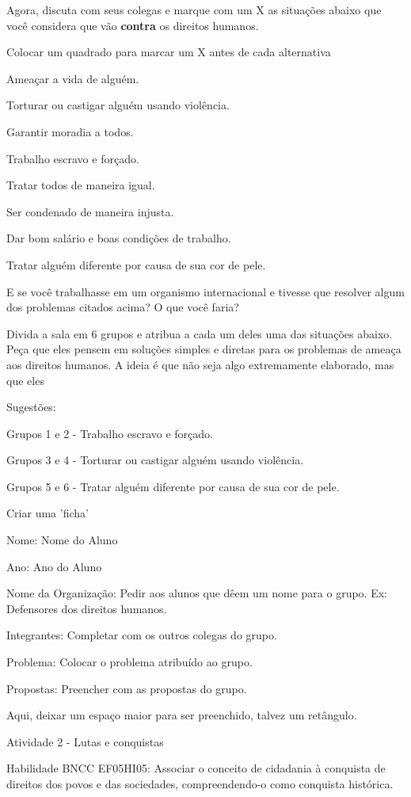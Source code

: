 Agora, discuta com seus colegas e marque com um X as situações abaixo
que você considera que vão \textbf{contra} os direitos humanos.

Colocar um quadrado para marcar um X antes de cada alternativa

Ameaçar a vida de alguém.

Torturar ou castigar alguém usando violência.

Garantir moradia a todos.

Trabalho escravo e forçado.

Tratar todos de maneira igual.

Ser condenado de maneira injusta.

Dar bom salário e boas condições de trabalho.

Tratar alguém diferente por causa de sua cor de pele.

E se você trabalhasse em um organismo internacional e tivesse que
resolver algum dos problemas citados acima? O que você faria?

Divida a sala em 6 grupos e atribua a cada um deles uma das situações
abaixo. Peça que eles pensem em soluções simples e diretas para os
problemas de ameaça aos direitos humanos. A ideia é que não seja algo
extremamente elaborado, mas que eles

Sugestões:

Grupos 1 e 2 - Trabalho escravo e forçado.

Grupos 3 e 4 - Torturar ou castigar alguém usando violência.

Grupos 5 e 6 - Tratar alguém diferente por causa de sua cor de pele.

Criar uma 'ficha'

Nome: Nome do Aluno

Ano: Ano do Aluno

Nome da Organização: Pedir aos alunos que dêem um nome para o grupo. Ex:
Defensores dos direitos humanos.

Integrantes: Completar com os outros colegas do grupo.

Problema: Colocar o problema atribuído ao grupo.

Propostas: Preencher com as propostas do grupo.

Aqui, deixar um espaço maior para ser preenchido, talvez um retângulo.

Atividade 2 - Lutas e conquistas

Habilidade BNCC EF05HI05: Associar o conceito de cidadania à conquista
de direitos dos povos e das sociedades, compreendendo-o como conquista
histórica.


